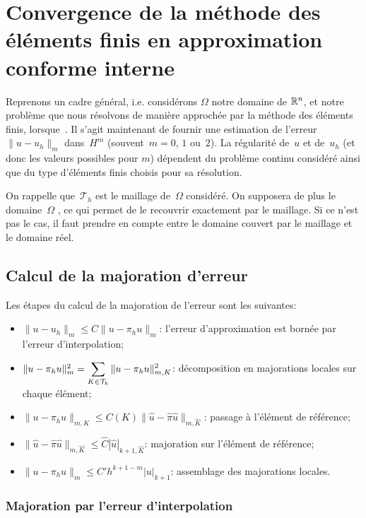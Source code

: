 \medskip
\section{Convergence de la méthode des éléments finis en approximation conforme interne}

Reprenons un cadre général, i.e. considérons $\Omega$ notre domaine de $\mathbb R^n$, et notre problème que nous résolvons de manière approchée par la méthode des éléments finis, lorsque~. Il s'agit maintenant de fournir une estimation de l'erreur~$\|u-u_h\|_m$ dans~$H^m$ (souvent~$m = 0$, $1$ ou~$2$). La régularité de~$u$ et de~$u_h$ (et donc les valeurs possibles pour $m$) dépendent du problème continu considéré ainsi que du type d'éléments finis choisis pour sa résolution.

\medskip
On rappelle que~$\mathcal{T}_h$ est le maillage de~$\Omega$ considéré. On supposera de plus le domaine~$\Omega$ , ce qui permet de le recouvrir exactement par le maillage. Si ce n'est pas le cas, il faut prendre en compte  entre le domaine couvert par le maillage et le domaine réel.


\medskip
\subsection{Calcul de la majoration d'erreur}

Les étapes du calcul de la majoration de l'erreur sont les suivantes:
\begin{itemize}
  \item $\|u-u_h\|_m\le C\|u-\pi_hu\|_m$: l'erreur d'approximation est bornée par l'erreur
	d'interpolation;
  \item $\|u-\pi_hu\|^2_m=\displaystyle\sum_{K\in\mathcal{T}_h}\|u-\pi_hu\|^2_{m,K}$:
	décomposition en majorations locales sur chaque élément;
  \item $\|u-\pi_hu\|_{m,K}\le C(K)\|\hat{u}-\hat{\pi}\hat{u}\|_{m,\hat{K}}$:
	passage à l'élément de référence;
  \item $\|\hat{u}-\hat{\pi}\hat{u}\|_{m,\hat{K}}\le \hat{C}|\hat{u}|_{k+1,\hat{K}}$:
	majoration sur l'élément de référence;
  \item $\|u-\pi_hu\|_m\le C'h^{k+1-m}|u|_{k+1}$:
	assemblage des majorations locales.
\end{itemize}

\medskip
\subsubsection{Majoration par l'erreur d'interpolation}

